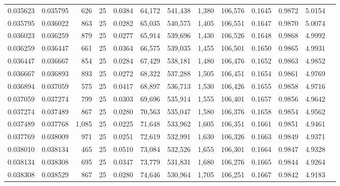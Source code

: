 \begin{tabular}{rrrrrrrrrrrrr}
0.035623 & 0.035795 &   626 &  25 &                                     0.0384 &  64,172 & 541,438 &   1,380 & 106,576 & 0.1645 & 0.9872 & 5.0154 \\
0.035795 & 0.036022 &   863 &  25 &                                     0.0282 &  65,035 & 540,575 &   1,405 & 106,551 & 0.1647 & 0.9870 & 5.0074 \\
0.036023 & 0.036259 &   879 &  25 &                                     0.0277 &  65,914 & 539,696 &   1,430 & 106,526 & 0.1648 & 0.9868 & 4.9992 \\
0.036259 & 0.036447 &   661 &  25 &                                     0.0364 &  66,575 & 539,035 &   1,455 & 106,501 & 0.1650 & 0.9865 & 4.9931 \\
0.036447 & 0.036667 &   854 &  25 &                                     0.0284 &  67,429 & 538,181 &   1,480 & 106,476 & 0.1652 & 0.9863 & 4.9852 \\
0.036667 & 0.036893 &   893 &  25 &                                     0.0272 &  68,322 & 537,288 &   1,505 & 106,451 & 0.1654 & 0.9861 & 4.9769 \\
0.036894 & 0.037059 &   575 &  25 &                                     0.0417 &  68,897 & 536,713 &   1,530 & 106,426 & 0.1655 & 0.9858 & 4.9716 \\
0.037059 & 0.037274 &   799 &  25 &                                     0.0303 &  69,696 & 535,914 &   1,555 & 106,401 & 0.1657 & 0.9856 & 4.9642 \\
0.037274 & 0.037489 &   867 &  25 &                                     0.0280 &  70,563 & 535,047 &   1,580 & 106,376 & 0.1658 & 0.9854 & 4.9562 \\
0.037489 & 0.037768 & 1,085 &  25 &                                     0.0225 &  71,648 & 533,962 &   1,605 & 106,351 & 0.1661 & 0.9851 & 4.9461 \\
0.037769 & 0.038009 &   971 &  25 &                                     0.0251 &  72,619 & 532,991 &   1,630 & 106,326 & 0.1663 & 0.9849 & 4.9371 \\
0.038010 & 0.038134 &   465 &  25 &                                     0.0510 &  73,084 & 532,526 &   1,655 & 106,301 & 0.1664 & 0.9847 & 4.9328 \\
0.038134 & 0.038308 &   695 &  25 &                                     0.0347 &  73,779 & 531,831 &   1,680 & 106,276 & 0.1665 & 0.9844 & 4.9264 \\
0.038308 & 0.038529 &   867 &  25 &                                     0.0280 &  74,646 & 530,964 &   1,705 & 106,251 & 0.1667 & 0.9842 & 4.9183 \\

\end{tabular}
